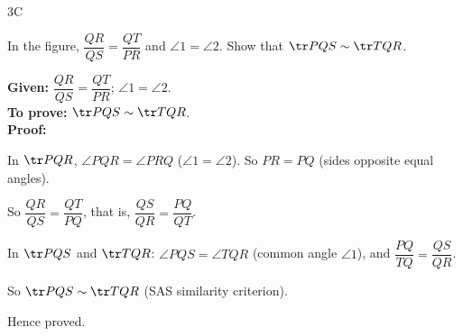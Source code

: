 \begin{exercise}{3C}
\item In the figure, $\dfrac{QR}{QS}=\dfrac{QT}{PR}$ and $\angle1=\angle2$. Show that $\tr PQS\sim\tr TQR$.
\begin{solution}
\textbf{Given:} $\dfrac{QR}{QS}=\dfrac{QT}{PR}$; $\angle1=\angle2$.\\
\textbf{To prove:} $\tr PQS\sim\tr TQR$.\\
\textbf{Proof:}
\begin{steps}
  \item In $\tr PQR$, $\angle PQR=\angle PRQ$ ($\angle1=\angle2$). So $PR=PQ$ (sides opposite equal angles).
  \item So $\dfrac{QR}{QS}=\dfrac{QT}{PQ}$, that is, $\dfrac{QS}{QR}=\dfrac{PQ}{QT}$.
  \item In $\tr PQS$ and $\tr TQR$: $\angle PQS=\angle TQR$ (common angle $\angle1$), and $\dfrac{PQ}{TQ}=\dfrac{QS}{QR}$.
  \item So $\tr PQS\sim\tr TQR$ (SAS similarity criterion).
\end{steps}
Hence proved.
\end{solution}


\end{exercise}

